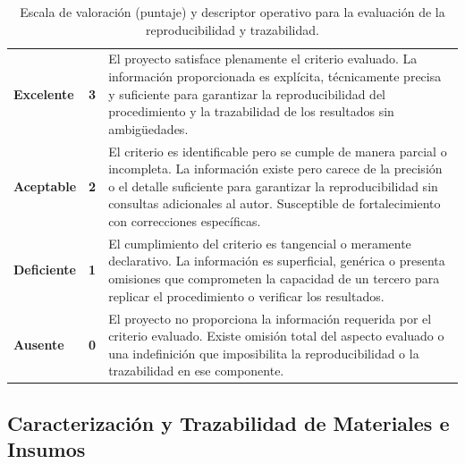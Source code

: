 \begin{table}[htbp]
\centering
\scriptsize
\caption{Escala de valoración (puntaje) y descriptor operativo para la evaluación de la reproducibilidad y trazabilidad.}
\label{tab:escala-reproducibilidad}
\begin{tabularx}{\textwidth}{|C{2.8cm}|C{1cm}|X|}
\hline
{}
 &  &  \\ \hline
\textcolor{csuf}{\textbf{Excelente}} & \textbf{3} & El proyecto satisface plenamente el criterio evaluado. La información proporcionada es explícita, técnicamente precisa y suficiente para garantizar la reproducibilidad del procedimiento y la trazabilidad de los resultados sin ambigüedades. \\ \hline
{}
\textcolor{cace}{\textbf{Aceptable}} & \textbf{2} & El criterio es identificable pero se cumple de manera parcial o incompleta. La información existe pero carece de la precisión o el detalle suficiente para garantizar la reproducibilidad sin consultas adicionales al autor. Susceptible de fortalecimiento con correcciones específicas. \\ \hline
\textcolor{cdef}{\textbf{Deficiente}} & \textbf{1} & El cumplimiento del criterio es tangencial o meramente declarativo. La información es superficial, genérica o presenta omisiones que comprometen la capacidad de un tercero para replicar el procedimiento o verificar los resultados. \\ \hline
{}
\textcolor{cins}{\textbf{Ausente}} & \textbf{0} & El proyecto no proporciona la información requerida por el criterio evaluado. Existe omisión total del aspecto evaluado o una indefinición que imposibilita la reproducibilidad o la trazabilidad en ese componente. \\ \hline
\end{tabularx}
\end{table}

\clearpage
\subsection{Caracterización y Trazabilidad de Materiales e Insumos}

